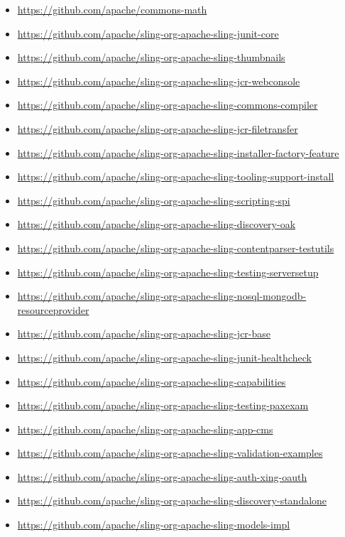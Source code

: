 \documentclass[sigconf]{acmart}
\begin{document}
\begin{itemize}
  \item \url{https://github.com/apache/commons-math}
  \item \url{https://github.com/apache/sling-org-apache-sling-junit-core}
  \item \url{https://github.com/apache/sling-org-apache-sling-thumbnails}
  \item \url{https://github.com/apache/sling-org-apache-sling-jcr-webconsole}
  \item \url{https://github.com/apache/sling-org-apache-sling-commons-compiler}
  \item \url{https://github.com/apache/sling-org-apache-sling-jcr-filetransfer}
  \item \url{https://github.com/apache/sling-org-apache-sling-installer-factory-feature}
  \item \url{https://github.com/apache/sling-org-apache-sling-tooling-support-install}
  \item \url{https://github.com/apache/sling-org-apache-sling-scripting-spi}
  \item \url{https://github.com/apache/sling-org-apache-sling-discovery-oak}
  \item \url{https://github.com/apache/sling-org-apache-sling-contentparser-testutils}
  \item \url{https://github.com/apache/sling-org-apache-sling-testing-serversetup}
  \item \url{https://github.com/apache/sling-org-apache-sling-nosql-mongodb-resourceprovider}
  \item \url{https://github.com/apache/sling-org-apache-sling-jcr-base}
  \item \url{https://github.com/apache/sling-org-apache-sling-junit-healthcheck}
  \item \url{https://github.com/apache/sling-org-apache-sling-capabilities}
  \item \url{https://github.com/apache/sling-org-apache-sling-testing-paxexam}
  \item \url{https://github.com/apache/sling-org-apache-sling-app-cms}
  \item \url{https://github.com/apache/sling-org-apache-sling-validation-examples}
  \item \url{https://github.com/apache/sling-org-apache-sling-auth-xing-oauth}
  \item \url{https://github.com/apache/sling-org-apache-sling-discovery-standalone}
  \item \url{https://github.com/apache/sling-org-apache-sling-models-impl}

\end{itemize}
\end{document}
